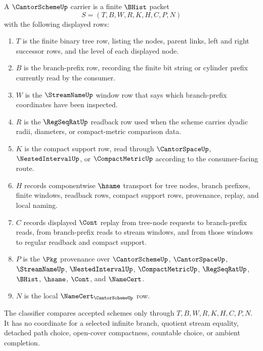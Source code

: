 \begin{definition}
\label{def:cantor-scheme-carrier}
A $\CantorSchemeUp$ carrier is a finite $\BHist$ packet
$$
S=(T,B,W,R,K,H,C,P,N)
$$
with the following displayed rows:
\begin{enumerate}
\item $T$ is the finite binary tree row, listing the nodes, parent links, left and right successor rows, and the level of each displayed node.
\item $B$ is the branch-prefix row, recording the finite bit string or cylinder prefix currently read by the consumer.
\item $W$ is the $\StreamNameUp$ window row that says which branch-prefix coordinates have been inspected.
\item $R$ is the $\RegSeqRatUp$ readback row used when the scheme carries dyadic radii, diameters, or compact-metric comparison data.
\item $K$ is the compact support row, read through $\CantorSpaceUp$, $\NestedIntervalUp$, or $\CompactMetricUp$ according to the consumer-facing route.
\item $H$ records componentwise $\hsame$ transport for tree nodes, branch prefixes, finite windows, readback rows, compact support rows, provenance, replay, and local naming.
\item $C$ records displayed $\Cont$ replay from tree-node requests to branch-prefix reads, from branch-prefix reads to stream windows, and from those windows to regular readback and compact support.
\item $P$ is the $\Pkg$ provenance over $\CantorSchemeUp$, $\CantorSpaceUp$, $\StreamNameUp$, $\NestedIntervalUp$, $\CompactMetricUp$, $\RegSeqRatUp$, $\BHist$, $\hsame$, $\Cont$, and $\NameCert$.
\item $N$ is the local $\NameCert_{\CantorSchemeUp}$ row.
\end{enumerate}
The classifier compares accepted schemes only through $T,B,W,R,K,H,C,P,N$. It has no coordinate for a selected infinite branch, quotient stream equality, detached path choice, open-cover compactness, countable choice, or ambient completion.
\end{definition}

